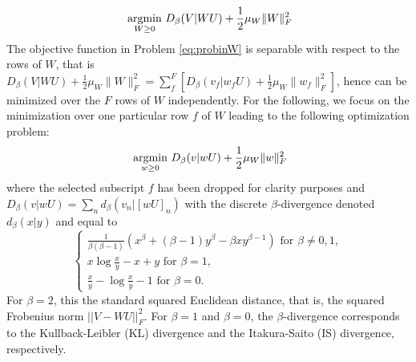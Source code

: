 \documentclass[a4paper, 11pt]{article}
\begin{document}
\begin{equation}\label{eq:probinW}
  \underset{W \geq 0}{\mathop{\text{~argmin~}}}D_{\beta}(V|WU) + \frac{1}{2} \mu_W \|W\|_F^2
\end{equation}
The objective function in Problem \eqref{eq:probinW} is separable with respect to the rows of $W$, that is $D_{\beta}(V|WU) + \frac{1}{2} \mu_W \|W\|_F^2=\sum_f^F \left[D_{\beta}(v_f|w_f U) + \frac{1}{2} \mu_W \|w_f\|_F^2 \right]$, hence can be minimized over the $F$ rows of $W$ independently. For the following, we focus on the minimization over one particular row $f$ of $W$ leading to the following optimization problem:
\begin{equation}\label{eq:probinw}
  \underset{w \geq 0}{\mathop{\text{~argmin~}}}D_{\beta}(v|wU) + \frac{1}{2} \mu_W \|w\|_F^2
\end{equation}
where the selected subscript $f$ has been dropped for clarity purposes and $D_{\beta}(v|wU)=\sum_{n}d_{\beta}(v_{n}|\left[wU\right]_{n})$ with the discrete $\beta$-divergence denoted $d_{\beta}(x|y)$ and equal to 
\[
\left\{
  \begin{array}{lr}
    \frac{1}{\beta \left(\beta-1\right)}   \left(x^{\beta}+\left(\beta-1\right)y^{\beta}-\beta xy^{\beta-1}\right)  \text{ for } 
     \beta \neq 0,1, \\
    x\log\frac{x}{y}-x+y           
         \text{ for } \beta=1,  \\
    \frac{x}{y}-\log\frac{x}{y}-1  
        \text{ for } \beta=0. 
  \end{array}
\right.
\] 
For $\beta=2$, this the standard squared Euclidean distance, that is, the squared Frobenius norm $||V-WU||_F^2$. 
For $\beta=1$ and $\beta=0$, 
the $\beta$-divergence corresponds to the Kullback-Leibler (KL) divergence and the Itakura-Saito (IS) divergence, respectively. 
\end{document}
